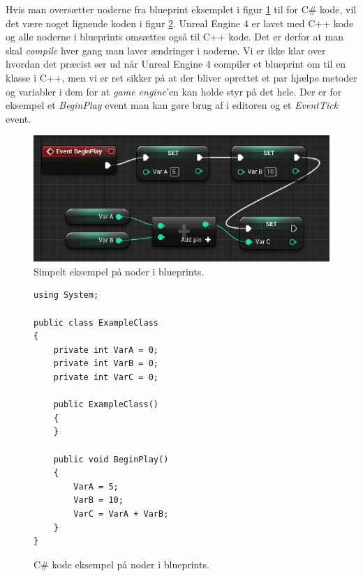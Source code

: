 Hvis man oversætter noderne fra blueprint eksemplet i figur \ref{dia:codeblueprint1} til for C\# kode, vil det være noget lignende koden i figur \ref{dia:codeblueprint2}. Unreal Engine 4 er lavet med C++ kode og alle noderne i blueprints omsættes også til C++ kode. Det er derfor at man skal \textit{compile} hver gang man laver ændringer i noderne. Vi er ikke klar over hvordan det præcist ser ud når Unreal Engine 4 compiler et blueprint om til en klasse i C++, men vi er ret sikker på at der bliver oprettet et par hjælpe metoder og variabler i dem for at \textit{game engine}'en kan holde styr på det hele. Der er for eksempel et \textit{BeginPlay} event man kan gøre brug af i editoren og et \textit{EventTick} event.

\begin{figure}
	\begin{center}
		\caption{Simpelt eksempel på noder i blueprints.}
		\label{dia:codeblueprint1}
		\includegraphics[width=0.80\linewidth]{pictures/blueprints/blueprint-example}
		\end{center}
\end{figure}

\begin{figure}
\caption{C\# kode eksempel på noder i blueprints.}
\label{dia:codeblueprint2}
\begin{lstlisting}
using System;

public class ExampleClass
{
    private int VarA = 0;
    private int VarB = 0;
    private int VarC = 0;

    public ExampleClass()
    {
    }
    
    public void BeginPlay()
    {
        VarA = 5;
        VarB = 10;
        VarC = VarA + VarB;
    }
}
\end{lstlisting}
\end{figure}